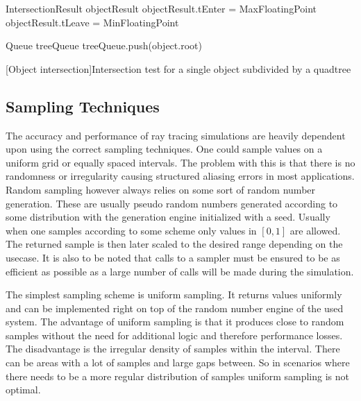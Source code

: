 \documentclass[a4paper,10pt]{article}
\begin{document}
    \begin{algorithm}
        \label{alg:object_intersect}
        \SetAlgoLined
        IntersectionResult objectResult\;
        objectResult.tEnter = MaxFloatingPoint\;
        objectResult.tLeave = MinFloatingPoint\;

        Queue treeQueue\;
        treeQueue.push(object.root)\;


        \caption{[Object intersection]Intersection test for a single object subdivided by a quadtree}
    \end{algorithm}


    \subsection{Sampling Techniques} \label{sec:sampling}

    The accuracy and performance of ray tracing simulations are heavily dependent upon
    using the correct sampling techniques.
    One could sample values on a uniform grid or equally spaced intervals.
    The problem with this is that there is no randomness or irregularity
    causing structured aliasing errors in most applications. 
    Random sampling however always relies on some sort of random number generation.
    These are usually pseudo random numbers generated according to some
    distribution with the generation engine initialized with a seed.
    Usually when one samples according to some scheme only values in 
    $[0,1]$ are allowed.
    The returned sample is then later scaled to the desired range depending
    on the usecase.
    It is also to be noted that calls to a sampler must be ensured to
    be as efficient as possible as a large number of calls will be
    made during the simulation.

    The simplest sampling scheme is uniform sampling.
    It returns values uniformly and can be implemented right on top of
    the random number engine of the used system.
    The advantage of uniform sampling is that it produces close to random
    samples without the need for additional logic and therefore
    performance losses.
    The disadvantage is the irregular density of samples within the interval.
    There can be areas with a lot of samples and large gaps between.
    So in scenarios where there needs to be a more regular distribution
    of samples uniform sampling is not optimal.
\end{document}
